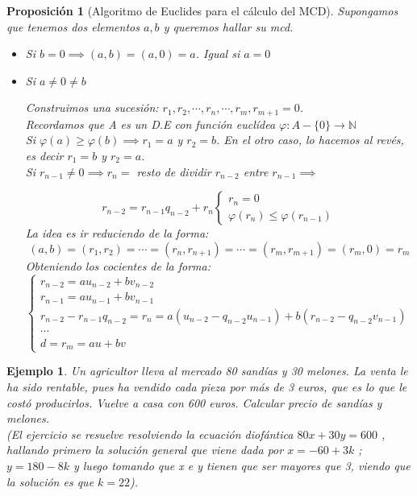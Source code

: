 \documentclass[11pt, a4paper, titlepage]{article}
\providecommand{\nat}{\mathbb{N}}
\theoremstyle{theorem-style}
\newtheorem*{nprop}{Proposición}
\theoremstyle{definition-style}
\theoremstyle{remark-style}
\theoremstyle{example-style}
\newtheorem*{ejemplo}{Ejemplo}
\begin{document}
\begin{nprop}[Algoritmo de Euclides para el cálculo del MCD]
Supongamos que tenemos dos elementos $a,b$ y queremos hallar su mcd.

\begin{itemize}
	
	\item Si $b=0 \implies (a,b) = (a,0) = a$. Igual si $a=0$
	
	\item Si $a \ne 0 \ne b$
	
	Construimos una sucesión: $r_1,r_2,\cdots, r_n, \cdots , r_m, r_{m+1} = 0$.\\
	Recordamos que A es un D.E con función euclídea $\varphi : A-\{0\} \to \nat $\\
	Si $\varphi(a) \geq \varphi(b)\implies r_1 = a$ y $r_2 = b$. En el otro caso, lo hacemos al revés, es decir  $r_1 = b $ y $r_2 = a$.\\
	Si $r_{n-1} \ne 0 \implies r_n= $ resto de dividir $r_{n-2}$ entre $r_{n-1} \implies$
	
	\[
	r_{n-2} = r_{n-1}q_{n-2} + r_n \begin{cases}
	 r_n = 0 \\
	  \varphi(r_n) \leq \varphi(r_{n-1})
\end{cases}
	 \]
La idea es ir reduciendo de la forma:
\[ (a,b) = (r_1,r_2) = \cdots = (r_n,r_{n+1}) = \cdots = (r_m, r_{m+1}) = (r_m,0) = r_m\]
Obteniendo los cocientes de la forma:
\[\begin{cases}
	r_{n-2} = au_{n-2} + bv_{n-2}\\

r_{n-1} = au_{n-1} + bv_{n-1}\\

r_{n-2} - r_{n-1}q_{n-2} = r_n = a(u_{n-2} - q_{n-2}u_{n-1}) + b(r_{n-2}-q_{n-2}v_{n-1})\\
\cdots \\

d = r_m = au + bv
\end{cases}
\quad
\]
	
	\end{itemize}
\end{nprop}

\begin{ejemplo}
	Un agricultor lleva al mercado 80 sandías y 30 melones. La venta le ha sido rentable, pues ha vendido cada pieza por más de 3 euros, que es lo que le costó producirlos. Vuelve a casa con 600 euros. Calcular precio de sandías y melones.\\
	(El ejercicio se resuelve resolviendo la ecuación diofántica $80x +30y = 600$ , hallando primero la solución general que viene dada por $x = -60 + 3k$ ; $y = 180 - 8k$ y luego tomando que x e y tienen que ser mayores que 3, viendo que la solución es que $k=22$).
\end{ejemplo}
\end{document}
